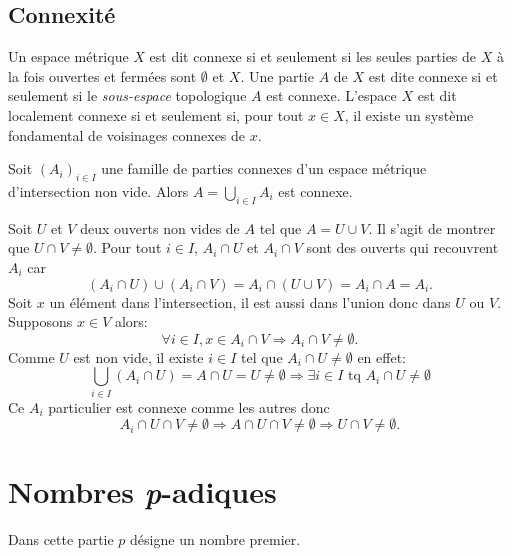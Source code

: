 \subsection{Connexité}
\begin{defi} 
 Un espace métrique $X$ est dit connexe si et seulement si les seules parties de $X$ à la fois ouvertes et fermées sont $\emptyset$ et $X$. Une partie $A$ de $X$ est dite connexe si et seulement si le \emph{sous-espace} topologique $A$ est connexe.\newline
 L'espace $X$ est dit localement connexe si et seulement si, pour tout $x\in X$,  il existe un système fondamental de voisinages connexes de $x$.
\end{defi}
\begin{prop}
 Soit $(A_i)_{i\in I}$ une famille de parties connexes d'un espace métrique d'intersection non vide. Alors $A = \bigcup_{i\in I}A_i$ est connexe.
\end{prop}
\begin{demo}
 Soit $U$ et $V$ deux ouverts non vides de $A$ tel que $A = U \cup V$. Il s'agit de montrer que $U \cap V \neq \emptyset$.\newline
Pour tout $i \in I$, $A_i \cap U$ et $A_i \cap V$ sont des ouverts qui recouvrent $A_i$ car
\begin{displaymath}
 (A_i \cap U) \cup (A_i \cap V) = A_i \cap (U \cup V) = A_i \cap A = A_i.
\end{displaymath}
Soit $x$ un élément dans l'intersection, il est aussi dans l'union donc dans $U$ ou $V$. Supposons $x\in V$ alors:
\begin{displaymath}
 \forall i \in I, x \in A_i \cap V \Rightarrow A_i \cap V \neq \emptyset .
\end{displaymath}
Comme $U$ est non vide, il existe $i \in I$ tel que $A_i \cap U \neq \emptyset$ en effet:
 \begin{displaymath}
  \bigcup_{i \in I}(A_i \cap U) = A \cap U = U \neq \emptyset \Rightarrow \exists i \in I \text{ tq } A_i \cap U \neq \emptyset
 \end{displaymath}
Ce $A_i$ particulier est connexe comme les autres donc
\begin{displaymath}
 A_i \cap U \cap V \neq \emptyset \Rightarrow A \cap U \cap V \neq \emptyset \Rightarrow U \cap V \neq \emptyset.
\end{displaymath}
\end{demo}


\section{Nombres \emph{p}-adiques}\label{Sec:NbsPadic}
\noindent Dans cette partie $p$ désigne un nombre premier.

